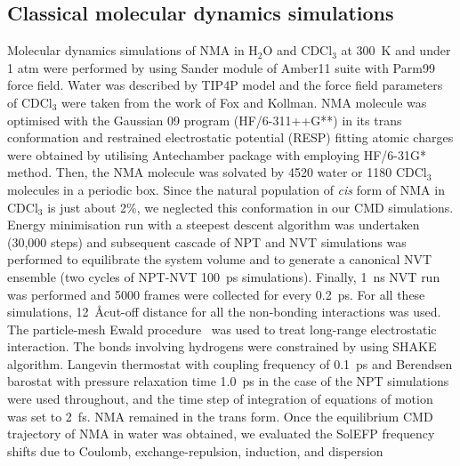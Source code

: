 \documentclass[a4paper,titlepage,twoside,fleqn,12pt]{book}
\begin{document}
\begin{appendices}
\begin{refsection}
\subsection{Classical molecular dynamics simulations}

Molecular dynamics simulations of NMA in H$_2$O and
CDCl$_3$ at 300~K and under 1 atm were performed by using
Sander module of {\sc Amber11} suite \citep{AMBER.11.2009} 
with Parm99 force field. \citep{Wang.Cieplak.Kollman.JCC.2000}
Water was described by TIP4P model \citep{Jorgensen.Chandrasekhar.Madura.Impey.Klein.JCP.1983} 
and the force field
parameters of CDCl$_3$ were taken from the work of Fox and
Kollman. \citep{Fox.Kollman.JPCB.1998} 
NMA molecule was optimised with the {\sc Gaussian 09}
program (HF/6-311++G**) in its trans conformation
and restrained electrostatic potential (RESP) fitting atomic
charges \citep{Bayly.Cieplak.Cornell.Kollman.JPC.1993} 
were obtained by utilising {\sc Antechamber} package \citep{Antechamber.JMGM.2006}
with employing HF/6-31G* method. \citep{Hariharan.Pople.TCA.1973} 
Then, the NMA
molecule was solvated by 4520 water or 1180 CDCl$_3$
molecules in a periodic box. Since the natural population of
\emph{cis} form of NMA in CDCl$_3$ is just about 2\%, we neglected this
conformation in our CMD simulations. \citep{Akiyama.Ohtani.SpectActA.1994}
Energy minimisation
run with a steepest descent algorithm was undertaken (30,000
steps) and subsequent cascade of NPT and NVT simulations
was performed to equilibrate the system volume and to
generate a canonical NVT ensemble (two cycles of NPT\hyp{}NVT
100~ps simulations). Finally, 1~ns NVT run was performed
and 5000 frames were collected for every 0.2~ps. For all these
simulations, 12~\AA cut\hyp{}off distance for all the non-bonding
interactions was used. The particle\hyp{}mesh Ewald 
procedure~\citep{Darden.York.Pedersen.JCP.1993}
was used to treat long\hyp{}range electrostatic interaction. The
bonds involving hydrogens were constrained by using SHAKE
algorithm. \citep{Ryckaert.Ciccotti.Berendsen.JComputPhys.1977} 
Langevin thermostat \citep{Izaguirre.Catarello.Wozniak.Skeel.JCP.2001}
with coupling frequency
of 0.1~ps and Berendsen barostat \citep{Berendsen.Postma.Gunsteren.DiNola.Haak.JCP.1984} 
with pressure relaxation
time 1.0~ps in the case of the NPT simulations were used
throughout, and the time step of integration of equations of
motion was set to 2~fs. NMA remained in the trans form.
Once the equilibrium CMD trajectory of NMA in water
was obtained, we evaluated the SolEFP frequency shifts due
to Coulomb, exchange\hyp{}repulsion, induction, and dispersion

\end{refsection}
\end{appendices}
\end{document}

